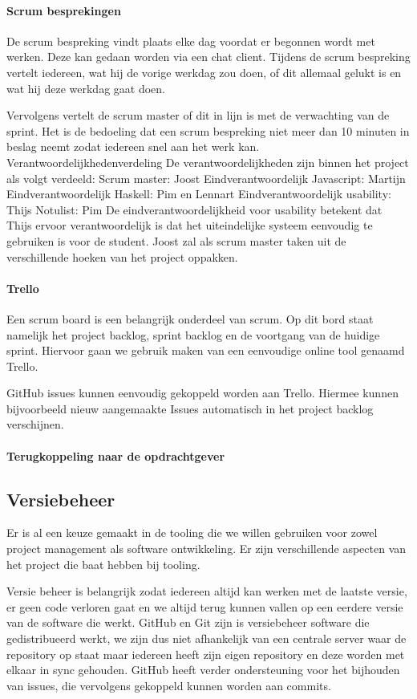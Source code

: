 \paragraph{Scrum besprekingen} 
De scrum bespreking vindt plaats elke dag voordat er begonnen wordt met werken. Deze kan gedaan worden via een chat client. Tijdens de scrum bespreking vertelt iedereen, wat hij de vorige werkdag zou doen, of dit allemaal gelukt is en wat hij deze werkdag gaat doen.

Vervolgens vertelt de scrum master of dit in lijn is met de verwachting van de sprint. Het is de bedoeling dat een scrum bespreking niet meer dan 10 minuten in beslag neemt zodat iedereen snel aan het werk kan.
Verantwoordelijkhedenverdeling
De verantwoordelijkheden zijn binnen het project als volgt verdeeld:
Scrum master: Joost
Eindverantwoordelijk Javascript: Martijn
Eindverantwoordelijk Haskell: Pim en Lennart
Eindverantwoordelijk usability: Thijs
Notulist: Pim
De eindverantwoordelijkheid voor usability betekent dat Thijs ervoor verantwoordelijk is dat het uiteindelijke systeem eenvoudig te gebruiken is voor de student. Joost zal als scrum master taken uit de verschillende hoeken van het project oppakken. 

\paragraph{Trello}
Een scrum board is een belangrijk onderdeel van scrum. Op dit bord staat namelijk het project backlog, sprint backlog en de voortgang van de huidige sprint. Hiervoor gaan we gebruik maken van een eenvoudige online tool genaamd Trello.

GitHub issues kunnen eenvoudig gekoppeld worden aan Trello. Hiermee kunnen bijvoorbeeld nieuw aangemaakte Issues automatisch in het project backlog verschijnen.

\paragraph{Terugkoppeling naar de opdrachtgever}

\subsection{Versiebeheer}
Er is al een keuze gemaakt in de tooling die we willen gebruiken voor zowel project management als software ontwikkeling. Er zijn verschillende aspecten van het project die baat hebben bij tooling.

Versie beheer is belangrijk zodat iedereen altijd kan werken met de laatste versie, er geen code verloren gaat en we altijd terug kunnen vallen op een eerdere versie van de software die werkt. GitHub en Git zijn is versiebeheer software die gedistribueerd werkt, we zijn dus niet afhankelijk van een centrale server waar de repository op staat maar iedereen heeft zijn eigen repository en deze worden met elkaar in sync gehouden. GitHub heeft verder ondersteuning voor het bijhouden van issues, die vervolgens gekoppeld kunnen worden aan commits.
